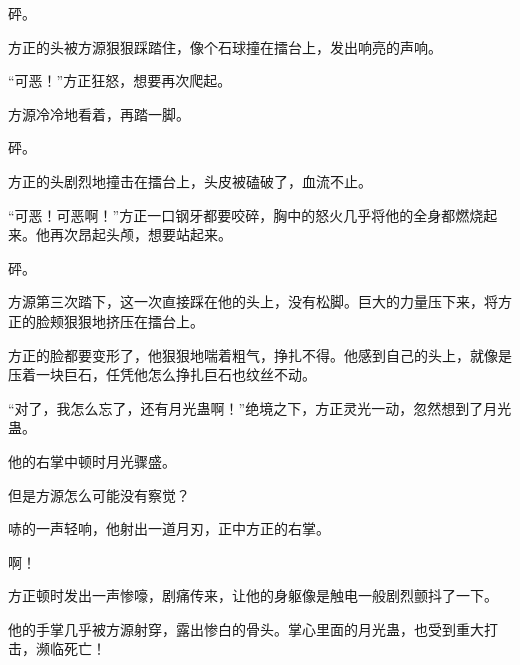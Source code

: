 \begin{this_body}
砰。

方正的头被方源狠狠踩踏住，像个石球撞在擂台上，发出响亮的声响。

“可恶！”方正狂怒，想要再次爬起。

方源冷冷地看着，再踏一脚。

砰。

方正的头剧烈地撞击在擂台上，头皮被磕破了，血流不止。

“可恶！可恶啊！”方正一口钢牙都要咬碎，胸中的怒火几乎将他的全身都燃烧起来。他再次昂起头颅，想要站起来。

砰。

方源第三次踏下，这一次直接踩在他的头上，没有松脚。巨大的力量压下来，将方正的脸颊狠狠地挤压在擂台上。

方正的脸都要变形了，他狠狠地喘着粗气，挣扎不得。他感到自己的头上，就像是压着一块巨石，任凭他怎么挣扎巨石也纹丝不动。

“对了，我怎么忘了，还有月光蛊啊！”绝境之下，方正灵光一动，忽然想到了月光蛊。

他的右掌中顿时月光骤盛。

但是方源怎么可能没有察觉？

哧的一声轻响，他射出一道月刃，正中方正的右掌。

啊！

方正顿时发出一声惨嚎，剧痛传来，让他的身躯像是触电一般剧烈颤抖了一下。

他的手掌几乎被方源射穿，露出惨白的骨头。掌心里面的月光蛊，也受到重大打击，濒临死亡！

\end{this_body}

